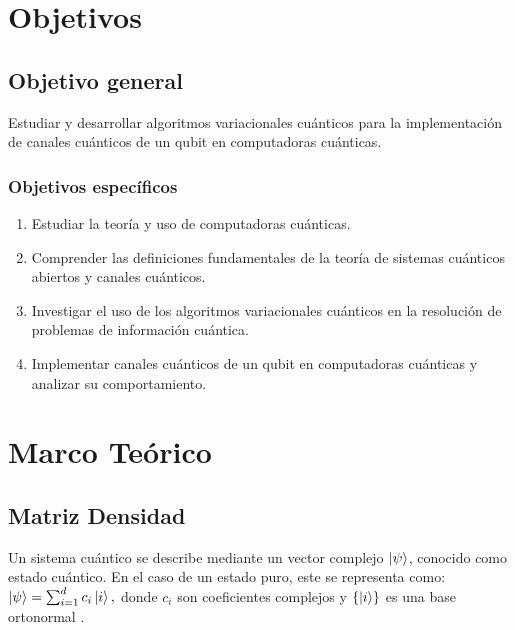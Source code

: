 \documentclass[11pt, spanish, letterpage]{article} %
\newcounter{problem}[section]
\begin{document}
%

\tableofcontents

\bigskip



\section{Objetivos}
\subsection{Objetivo general}

Estudiar y desarrollar algoritmos variacionales cuánticos para la
implementación de canales cuánticos de un  qubit en computadoras cuánticas.


\subsubsection{Objetivos específicos}


\begin{enumerate}
    \item Estudiar la teoría y uso de computadoras cuánticas.
    \item Comprender las definiciones fundamentales de la teoría de sistemas cuánticos abiertos y canales cuánticos.
    \item Investigar el uso de los algoritmos variacionales cuánticos en la resolución de problemas de información cuántica.
    \item Implementar canales cuánticos de un qubit en computadoras cuánticas y analizar su comportamiento.
\end{enumerate}



\section{Marco Teórico} %

\subsection{Matriz Densidad}

Un sistema cuántico se describe mediante un vector complejo $\ket{\psi}$, conocido como estado cuántico. En el caso de un estado puro, este se representa como: 
$ \ket{\psi} = \sum_{i=1}^{d} c_i \ket{i}, $
donde $c_i$ son coeficientes complejos y $\{\ket{i}\}$ es una base ortonormal \cite{nielsen_chuang_2011}.
\end{document}
